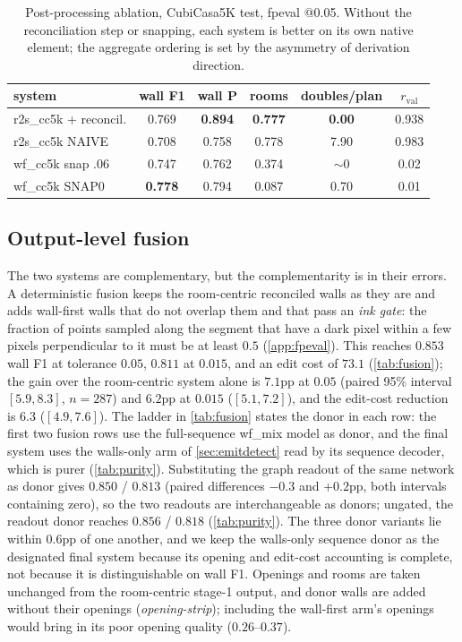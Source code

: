 \documentclass{article}
\newcommand{\tbf}[1]{\textbf{#1}}
\begin{document}
\begin{table}[t]
\centering
\caption{Post-processing ablation, CubiCasa5K test, fpeval @0.05. Without the
reconciliation step or snapping, each system is better on its own native
element; the aggregate ordering is set by the asymmetry of derivation
direction.}
\label{tab:postproc}
\small
\begin{tabular}{lccccc}
\toprule
system & wall F1 & wall P & rooms & doubles/plan & $r_{\mathrm{val}}$ \\
\midrule
r2s\_cc5k + reconcil.       & 0.769 & \tbf{0.894} & \tbf{0.777} & \tbf{0.00} & 0.938 \\
r2s\_cc5k NAIVE         & 0.708 & 0.758 & 0.778 & 7.90 & 0.983 \\
wf\_cc5k snap .06       & 0.747 & 0.762 & 0.374 & $\sim$0 & 0.02 \\
wf\_cc5k SNAP0          & \tbf{0.778} & 0.794 & 0.087 & 0.70 & 0.01 \\
\bottomrule
\end{tabular}
\end{table}

\subsection{Output-level fusion}\label{sec:fusion}
The two systems are complementary, but the complementarity is in their
errors. A deterministic fusion keeps the room-centric reconciled walls as they
are and adds wall-first walls that do not overlap them and that pass an
\emph{ink gate}: the fraction of points sampled along the segment that have a
dark pixel within a few pixels perpendicular to it must be at least $0.5$
(\cref{app:fpeval}). This reaches $0.853$ wall F1 at
tolerance $0.05$, $0.811$ at $0.015$, and an edit cost of $73.1$
(\cref{tab:fusion}); the gain over the
room-centric system alone is $7.1$pp at $0.05$ (paired 95\% interval
$[5.9,8.3]$, $n=287$) and $6.2$pp at $0.015$ ($[5.1,7.2]$), and the edit-cost
reduction is $6.3$ ($[4.9,7.6]$). The ladder in \cref{tab:fusion} states the
donor in each row: the first two fusion rows use the full-sequence wf\_mix
model as donor, and the final system uses the walls-only arm of
\cref{sec:emitdetect} read by its sequence decoder, which is purer
(\cref{tab:purity}). Substituting the graph readout of the same network as
donor gives $0.850$ / $0.813$ (paired differences $-0.3$ and $+0.2$pp, both
intervals containing zero), so the two readouts are interchangeable as
donors; ungated, the readout donor reaches $0.856$ / $0.818$
(\cref{tab:purity}). The three donor variants lie within $0.6$pp of one
another, and we keep the walls-only sequence donor as the designated final
system because its opening and edit-cost accounting is complete, not because
it is distinguishable on wall F1. Openings and rooms are taken
unchanged from the room-centric stage-1 output, and donor walls are added
without their openings (\emph{opening-strip}); including the wall-first arm's
openings would bring in its poor opening quality ($0.26$--$0.37$).
\end{document}
